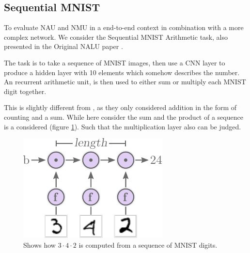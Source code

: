 \subsection{Sequential MNIST}

To evaluate NAU and NMU in a end-to-end context in combination with a more complex network. We consider the Sequential MNIST Arithmetic task, also presented in the Original NALU paper \cite{trask-nalu}.

The task is to take a sequence of MNIST images, then use a CNN layer to produce a hidden layer with 10 elements which somehow describes the number. An recurrent arithmetic unit, is then used to either sum or multiply each MNIST digit together.

This is slightly different from \cite{trask-nalu}, as they only considered addition in the form of counting and a sum. While here consider the sum and the product of a sequence is a considered (figure \ref{fig:mnist-sequence-problem}). Such that the multiplication layer also can be judged.

\begin{figure}[H]
\centering
\includegraphics[scale=1]{graphics/mnist_sequence_problem.pdf}
\caption{Shows how $3 \cdot 4 \cdot2$ is computed from a sequence of MNIST digits.}
\label{fig:mnist-sequence-problem}
\end{figure}


